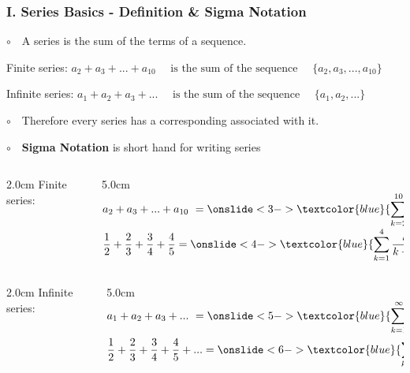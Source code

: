 \begin{frame}
\frametitle{I. Series Basics - Definition \& Sigma Notation}
\scriptsize

$\circ$ \,\, A series is the sum of the terms of a sequence. \\

\vspace{0.2cm}

\qquad Finite series: \qquad
$\displaystyle{a_2+a_3+...+a_{10} \quad \text{ is the sum of the sequence } \quad \{a_2, a_3, ..., a_{10}\}}$

\vspace{0.2cm}

\qquad Infinite series: \qquad
$\displaystyle{a_1+a_2+a_3+... \quad \text{ is the sum of the sequence } \quad \{a_1, a_2, ...\}}$

\vspace{0.4cm}

$\circ$ \,\, Therefore every series has a corresponding \quad {} \quad associated with it. 

\vspace{0.4cm}

$\circ$ \,\, {\bf Sigma Notation} is short hand for writing series \\

\vspace{0.4cm}

\begin{columns}
\begin{column}{2.0cm}
	Finite series: \\
	\vspace{1.2cm}
\end{column}
\begin{column}{5.0cm}
	$\displaystyle{a_2+a_3+...+a_{10} \,\,= \onslide<3->{\textcolor{blue}{\sum \limits_{k=2}^{10} a_k}}}$ \\
	\vspace{0.2cm}
	$\displaystyle{\frac{1}{2} + \frac{2}{3} + \frac{3}{4} + \frac{4}{5} = \onslide<4->{\textcolor{blue}{\sum \limits_{k=1}^{4} \frac{k}{k+1}}}}$
\end{column}
\end{columns}

\vspace{0.2cm}

\begin{columns}
\begin{column}{2.0cm}
	Infinite series: \\
	\vspace{1.2cm}
\end{column}
\begin{column}{5.0cm}
	$\displaystyle{a_1+a_2+a_3+... \,\,= \onslide<5->{\textcolor{blue}{\sum \limits_{k=1}^{\infty} a_k}}}$ \\
	\vspace{0.2cm}
	$\displaystyle{\frac{1}{2} + \frac{2}{3} + \frac{3}{4} + \frac{4}{5} + ... = \onslide<6->{\textcolor{blue}{\sum \limits_{k=1}^{\infty} \frac{k}{k+1}}}}$
\end{column}
\end{columns}

\end{frame}

